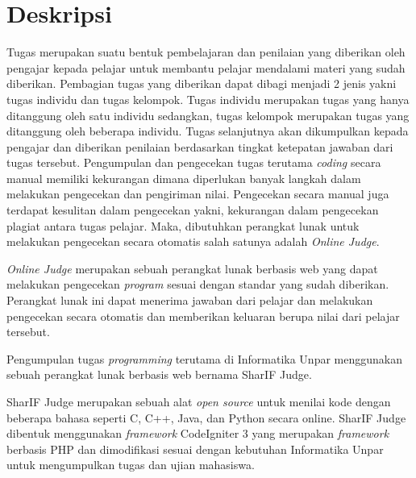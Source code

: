 \documentclass[a4paper,twoside]{article}
\begin{document}
\title{\@judultopik}
\author{\nama \textendash \@npm} 

\newcommand{\nama}{Filipus}
\newcommand{\@npm}{6181901074}
\newcommand{\@judultopik}{Konversi SharIF Judge dari CodeIgniter 3 ke CodeIgniter 4} %
\newcommand{\jumpemb}{1} %
\newcommand{\tanggal}{22/02/2023}


\maketitle


\section{Deskripsi}
Tugas merupakan suatu bentuk pembelajaran dan penilaian yang diberikan oleh pengajar kepada pelajar untuk membantu pelajar mendalami materi yang sudah diberikan. Pembagian tugas yang diberikan dapat dibagi menjadi 2 jenis yakni tugas individu dan tugas kelompok. Tugas individu merupakan tugas yang hanya ditanggung oleh satu individu sedangkan, tugas kelompok merupakan tugas yang ditanggung oleh beberapa individu. Tugas selanjutnya akan dikumpulkan kepada pengajar dan diberikan penilaian berdasarkan tingkat ketepatan jawaban dari tugas tersebut. Pengumpulan dan pengecekan tugas terutama \textit{coding} secara manual memiliki kekurangan dimana diperlukan banyak langkah dalam melakukan pengecekan dan pengiriman nilai. Pengecekan secara manual juga terdapat kesulitan dalam pengecekan yakni, kekurangan dalam pengecekan plagiat antara tugas pelajar. Maka, dibutuhkan perangkat lunak untuk melakukan pengecekan secara otomatis salah satunya adalah \textit{Online Judge}.

\textit{Online Judge} merupakan sebuah perangkat lunak berbasis web yang dapat melakukan pengecekan \textit{program} sesuai dengan standar yang sudah diberikan. Perangkat lunak ini dapat menerima jawaban dari pelajar dan melakukan pengecekan secara otomatis dan memberikan keluaran berupa nilai dari pelajar tersebut. 


Pengumpulan tugas \textit{programming} terutama di Informatika Unpar menggunakan sebuah perangkat lunak berbasis web bernama SharIF Judge. 

SharIF Judge merupakan sebuah alat \textit{open source} untuk menilai kode dengan beberapa bahasa seperti C, C++, Java, dan Python secara online. SharIF Judge dibentuk menggunakan \textit{framework} CodeIgniter 3 yang merupakan \textit{framework} berbasis PHP dan dimodifikasi sesuai dengan kebutuhan Informatika Unpar untuk mengumpulkan tugas dan ujian mahasiswa. 
\end{document}
